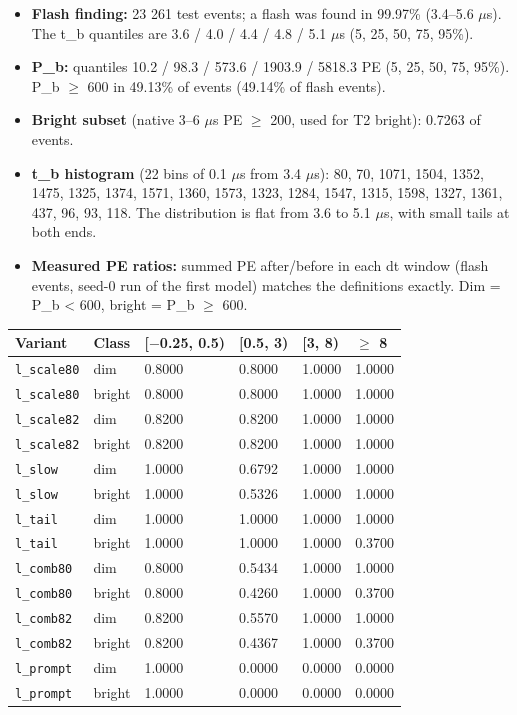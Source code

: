 \documentclass[10pt,a4paper]{article}
\begin{document}
\begin{itemize}
\item \textbf{Flash finding:} 23 261 test events; a flash was found in 99.97\% (3.4--5.6 $\mu$s). The t\_b quantiles are 3.6 / 4.0 / 4.4 / 4.8 / 5.1 $\mu$s (5, 25, 50, 75, 95\%).
\item \textbf{P\_b:} quantiles 10.2 / 98.3 / 573.6 / 1903.9 / 5818.3 PE (5, 25, 50, 75, 95\%). P\_b $\geq$ 600 in 49.13\% of events (49.14\% of flash events).
\item \textbf{Bright subset} (native 3--6 $\mu$s PE $\geq$ 200, used for T2 bright): 0.7263 of events.
\item \textbf{t\_b histogram} (22 bins of 0.1 $\mu$s from 3.4 $\mu$s): 80, 70, 1071, 1504, 1352, 1475, 1325, 1374, 1571, 1360, 1573, 1323, 1284, 1547, 1315, 1598, 1327, 1361, 437, 96, 93, 118. The distribution is flat from 3.6 to 5.1 $\mu$s, with small tails at both ends.
\item \textbf{Measured PE ratios:} summed PE after/before in each dt window (flash events, seed-0 run of the first model) matches the definitions exactly. Dim = P\_b < 600, bright = P\_b $\geq$ 600.
\end{itemize}
\begin{center}\footnotesize
\setlength{\tabcolsep}{3pt}\renewcommand{\arraystretch}{1.15}
\begin{tabularx}{\linewidth}{LLLLLL}
\toprule
\textbf{Variant} & \textbf{Class} & \textbf{[$-$0.25, 0.5)} & \textbf{[0.5, 3)} & \textbf{[3, 8)} & \textbf{$\geq$ 8} \\
\midrule
\texttt{l\_\allowbreak{}scale80} & dim & 0.8000 & 0.8000 & 1.0000 & 1.0000 \\
\texttt{l\_\allowbreak{}scale80} & bright & 0.8000 & 0.8000 & 1.0000 & 1.0000 \\
\texttt{l\_\allowbreak{}scale82} & dim & 0.8200 & 0.8200 & 1.0000 & 1.0000 \\
\texttt{l\_\allowbreak{}scale82} & bright & 0.8200 & 0.8200 & 1.0000 & 1.0000 \\
\texttt{l\_\allowbreak{}slow} & dim & 1.0000 & 0.6792 & 1.0000 & 1.0000 \\
\texttt{l\_\allowbreak{}slow} & bright & 1.0000 & 0.5326 & 1.0000 & 1.0000 \\
\texttt{l\_\allowbreak{}tail} & dim & 1.0000 & 1.0000 & 1.0000 & 1.0000 \\
\texttt{l\_\allowbreak{}tail} & bright & 1.0000 & 1.0000 & 1.0000 & 0.3700 \\
\texttt{l\_\allowbreak{}comb80} & dim & 0.8000 & 0.5434 & 1.0000 & 1.0000 \\
\texttt{l\_\allowbreak{}comb80} & bright & 0.8000 & 0.4260 & 1.0000 & 0.3700 \\
\texttt{l\_\allowbreak{}comb82} & dim & 0.8200 & 0.5570 & 1.0000 & 1.0000 \\
\texttt{l\_\allowbreak{}comb82} & bright & 0.8200 & 0.4367 & 1.0000 & 0.3700 \\
\texttt{l\_\allowbreak{}prompt} & dim & 1.0000 & 0.0000 & 0.0000 & 0.0000 \\
\texttt{l\_\allowbreak{}prompt} & bright & 1.0000 & 0.0000 & 0.0000 & 0.0000 \\
\bottomrule
\end{tabularx}
\end{center}
\end{document}
